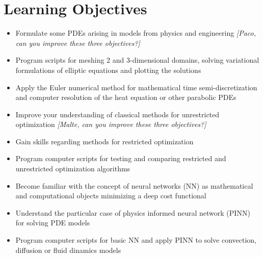 \documentclass[letterpaper]{inzane_syllabus} %
\begin{document}


\vspace{0.5cm}
\section{Learning Objectives}

\begin{itemize}
  \item Formulate some PDEs arising in models from physics and engineering \emph{\color{myCOLOR} [Paco, can you improve these three objectives?]}
  \item Program 
    scripts for meshing 2 and 3-dimensional domains, solving variational formulations of elliptic equations and plotting the solutions
  \item Apply the Euler numerical method for mathematical time semi-discretization and computer resolution of the heat equation or other parabolic PDEs
  \item Improve your understanding of classical methods for unrestricted optimization \emph{\color{myCOLOR} [Malte, can you improve these three objectives?]}
  \item Gain skills regarding methods for restricted optimization 
  \item Program computer scripts for testing and comparing restricted and unrestricted optimization algorithms 
  \item Become familiar with the concept of  neural networks (NN) as mathematical and computational objects minimizing a deep cost functional
  \item Understand the particular case of physics informed neural network (PINN) for solving PDE models
  \item Program computer scripts for basic NN and apply PINN to solve convection, diffusion or fluid dinamics models

\end{itemize}
\end{document}
